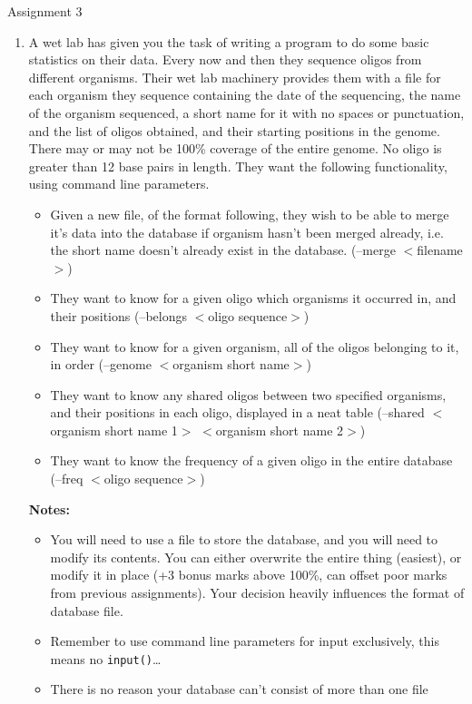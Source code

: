 \hypertarget{assignment3}{Assignment 3}
\begin{enumerate}
	\item A wet lab has given you the task of    writing a program to do some basic statistics on their data. Every    now and then they sequence oligos from different organisms. Their    wet lab machinery provides them with a file for each organism they    sequence containing the date of the sequencing, the name of the    organism sequenced, a short name for it with no spaces or    punctuation, and the list of oligos obtained, and their starting    positions in the genome. There may or may not be 100\% coverage of    the entire genome. No oligo is greater than 12 base pairs in    length. They want the following functionality, using command line    parameters.     
\begin{itemize}
	\item Given a new file, of the format following, they wish to be able to merge it's data into the database if organism hasn't been merged already, i.e. the short name doesn't already exist in the database. (--merge $<$filename$>$)
	\item They want to know for a given oligo which organisms it occurred in, and their positions (--belongs $<$oligo sequence$>$)
	\item They want to know for a given organism, all of the oligos belonging to it, in order (--genome $<$organism short name$>$)
	\item They want to know any shared oligos between two specified organisms, and their positions in each oligo, displayed in a neat table (--shared $<$organism short name 1$>$ $<$organism short name 2$>$)
	\item They want to know the frequency of a given oligo in the entire database (--freq $<$oligo sequence$>$)
\end{itemize}\textbf{Notes:}
\begin{itemize}
	\item You will need to use a file to store the database, and you will need to modify its contents. You can either overwrite the entire thing (easiest), or modify it in place (+3 bonus marks above 100\%, can offset poor marks from previous assignments). Your decision heavily influences the format of database file.
        \item Remember to use command line parameters for input exclusively, this means no \texttt{input()}\ldots
	\item There is no reason your database can't consist of more than one file

\end{itemize}
\end{enumerate}
